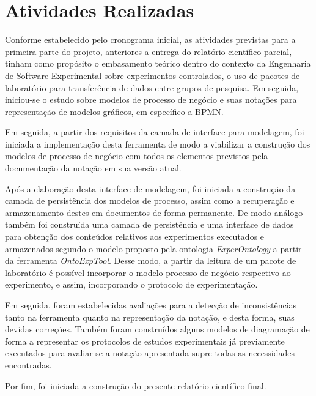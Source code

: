 \section{Atividades Realizadas}

Conforme estabelecido pelo cronograma inicial, as atividades previstas para a primeira parte do projeto, anteriores a entrega do relatório científico parcial, tinham como propósito o embasamento teórico dentro do contexto da Engenharia de Software Experimental sobre experimentos controlados, o uso de pacotes de laboratório para transferência de dados entre grupos de pesquisa. Em seguida, iniciou-se o estudo sobre modelos de processo de negócio e suas notações para representação de modelos gráficos, em específico a BPMN.

Em seguida, a partir dos requisitos da camada de interface para modelagem, foi iniciada a implementação desta ferramenta de modo a viabilizar a construção dos modelos de processo de negócio com todos os elementos previstos pela documentação da notação em sua versão atual.

Após a elaboração desta interface de modelagem, foi iniciada a construção da camada de persistência dos modelos de processo, assim como a recuperação e armazenamento destes em documentos de forma permanente. De modo análogo também foi construída uma camada de persistência e uma interface de dados para obtenção dos conteúdos relativos aos experimentos executados e armazenados segundo o modelo proposto pela ontologia \textit{ExperOntology} a partir da ferramenta \textit{OntoExpTool}. Desse modo, a partir da leitura de um pacote de laboratório é possível incorporar o modelo processo de negócio respectivo ao experimento, e assim, incorporando o protocolo de experimentação.

Em seguida, foram estabelecidas avaliações para a detecção de inconsistências tanto na ferramenta quanto na representação da notação, e desta forma, suas devidas correções. Também foram construídos alguns modelos de diagramação de forma a representar os protocolos de estudos experimentais já previamente executados para avaliar se a notação apresentada supre todas as necessidades encontradas.

Por fim, foi iniciada a construção do presente relatório científico final.


